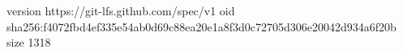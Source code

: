 version https://git-lfs.github.com/spec/v1
oid sha256:f4072fbd4ef335e54ab0d69c88ea20e1a8f3d0c72705d306e20042d934a6f20b
size 1318
